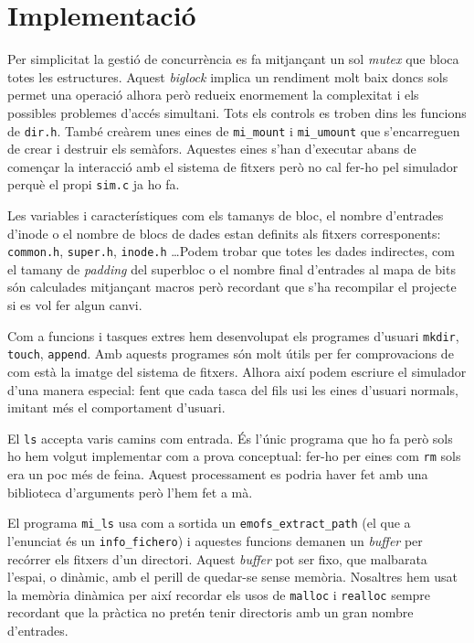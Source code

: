 
\section{Implementació}

Per simplicitat la gestió de concurrència es fa mitjançant un sol \emph{mutex}
que bloca totes les estructures. Aquest \emph{biglock} implica un rendiment
molt baix doncs sols permet una operació alhora però redueix enormement la
complexitat i els possibles problemes d'accés simultani. Tots els controls es
troben dins les funcions de \verb+dir.h+. També creàrem unes eines de
\verb+mi_mount+ i \verb+mi_umount+ que s'encarreguen de crear i destruir els
semàfors. Aquestes eines s'han d'executar abans de començar la interacció amb
el sistema de fitxers però no cal fer-ho pel simulador perquè el propi
\verb+sim.c+ ja ho fa.

Les variables i característiques com els tamanys de bloc, el nombre d'entrades
d'inode o el nombre de blocs de dades estan definits als fitxers corresponents:
\verb+common.h+, \verb+super.h+, \verb+inode.h+ \ldots Podem trobar que totes
les dades indirectes, com el tamany de \emph{padding} del superbloc o el nombre
final d'entrades al mapa de bits són calculades mitjançant macros però
recordant que s'ha recompilar el projecte si es vol fer algun canvi.

Com a funcions i tasques extres hem desenvolupat els programes d'usuari
\verb+mkdir+, \verb+touch+, \verb+append+. Amb aquests programes són molt útils
per fer comprovacions de com està la imatge del sistema de fitxers. Alhora així
podem escriure el simulador d'una manera especial: fent que cada tasca del fils
usi les eines d'usuari normals, imitant més el comportament d'usuari.

El \verb+ls+ accepta varis camins com entrada. És l'únic programa que ho fa
però sols ho hem volgut implementar com a prova conceptual: fer-ho per eines
com \verb+rm+ sols era un poc més de feina. Aquest processament es podria haver
fet amb una biblioteca d'arguments però l'hem fet a mà.

El programa \verb+mi_ls+ usa com a sortida un \verb+emofs_extract_path+ (el que
a l'enunciat és un \verb+info_fichero+) i aquestes funcions demanen un
\emph{buffer} per recórrer els fitxers d'un directori. Aquest \emph{buffer} pot
ser fixo, que malbarata l'espai, o dinàmic, amb el perill de quedar-se sense
memòria. Nosaltres hem usat la memòria dinàmica per així recordar els usos de
\verb+malloc+ i \verb+realloc+ sempre recordant que la pràctica no pretén tenir
directoris amb un gran nombre d'entrades.
